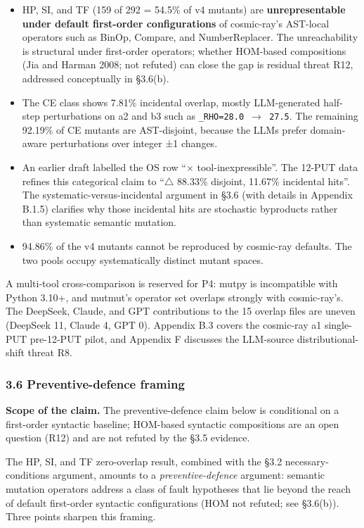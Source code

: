 \documentclass[review,12pt,authoryear]{elsarticle}
\providecommand{\tightlist}{\setlength{\itemsep}{0pt}\setlength{\parskip}{0pt}}
\begin{document}
\begin{itemize}
\tightlist
\item
  HP, SI, and TF (159 of 292 = 54.5\% of v4 mutants) are
  \textbf{unrepresentable under default first-order configurations} of
  cosmic-ray's AST-local operators such as BinOp, Compare, and
  NumberReplacer. The unreachability is structural under first-order
  operators; whether HOM-based compositions (Jia and Harman 2008; not
  refuted) can close the gap is residual threat R12, addressed
  conceptually in §3.6(b).
\item
  The CE class shows 7.81\% incidental overlap, mostly LLM-generated
  half-step perturbations on a2 and b3 such as
  \texttt{\_RHO=28.0\ $\to$\ 27.5}. The remaining 92.19\% of CE mutants are
  AST-disjoint, because the LLMs prefer domain-aware perturbations over
  integer ±1 changes.
\item
  An earlier draft labelled the OS row ``$\times$ tool-inexpressible''. The
  12-PUT data refines this categorical claim to ``$\bigtriangleup$ 88.33\% disjoint,
  11.67\% incidental hits''. The systematic-versus-incidental argument
  in §3.6 (with details in Appendix B.1.5) clarifies why those
  incidental hits are stochastic byproducts rather than systematic
  semantic mutation.
\item
  94.86\% of the v4 mutants cannot be reproduced by cosmic-ray defaults.
  The two pools occupy systematically distinct mutant spaces.
\end{itemize}

A multi-tool cross-comparison is reserved for P4: mutpy is incompatible
with Python 3.10+, and mutmut's operator set overlaps strongly with
cosmic-ray's. The DeepSeek, Claude, and GPT contributions to the 15
overlap files are uneven (DeepSeek 11, Claude 4, GPT 0). Appendix B.3
covers the cosmic-ray a1 single-PUT pre-12-PUT pilot, and Appendix F
discusses the LLM-source distributional-shift threat R8.

\subsubsection{3.6 Preventive-defence framing}\label{preventive-defence-framing}

\textbf{Scope of the claim.} The preventive-defence claim below is
conditional on a first-order syntactic baseline; HOM-based syntactic
compositions are an open question (R12) and are not refuted by the §3.5
evidence.

The HP, SI, and TF zero-overlap result, combined with the §3.2
necessary-conditions argument, amounts to a \emph{preventive-defence}
argument: semantic mutation operators address a class of fault
hypotheses that lie beyond the reach of default first-order syntactic
configurations (HOM not refuted; see §3.6(b)). Three points sharpen
this framing.
\end{document}
